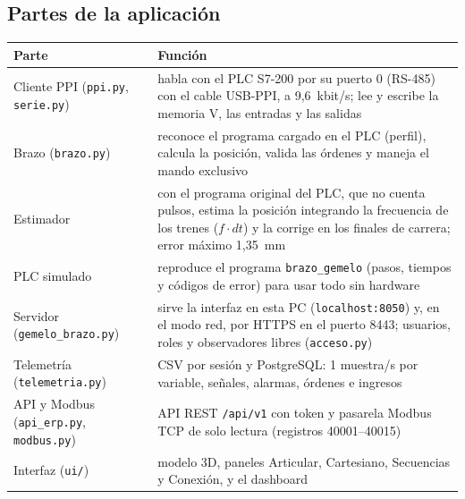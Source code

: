 \documentclass[11pt,a4paper]{article}
\newcommand{\codigo}[1]{\texttt{#1}}
\begin{document}
\subsection{Partes de la aplicación}
\begin{center}\small
\begin{tabularx}{\linewidth}{>{\raggedright}p{4.2cm} X}
\toprule
\textbf{Parte} & \textbf{Función}\\
\midrule
Cliente PPI (\codigo{ppi.py}, \codigo{serie.py}) & habla con el PLC S7-200 por su puerto 0 (RS-485) con el cable USB-PPI, a 9,6~kbit/s; lee y escribe la memoria V, las entradas y las salidas\\
Brazo (\codigo{brazo.py}) & reconoce el programa cargado en el PLC (perfil), calcula la posición, valida las órdenes y maneja el mando exclusivo\\
Estimador & con el programa original del PLC, que no cuenta pulsos, estima la posición integrando la frecuencia de los trenes ($f\cdot dt$) y la corrige en los finales de carrera; error máximo 1,35~mm\\
PLC simulado & reproduce el programa \codigo{brazo\_gemelo} (pasos, tiempos y códigos de error) para usar todo sin hardware\\
Servidor (\codigo{gemelo\_brazo.py}) & sirve la interfaz en esta PC (\codigo{localhost:8050}) y, en el modo red, por HTTPS en el puerto 8443; usuarios, roles y observadores libres (\codigo{acceso.py})\\
Telemetría (\codigo{telemetria.py}) & CSV por sesión y PostgreSQL: 1 muestra/s por variable, señales, alarmas, órdenes e ingresos\\
API y Modbus (\codigo{api\_erp.py}, \codigo{modbus.py}) & API REST \codigo{/api/v1} con token y pasarela Modbus TCP de solo lectura (registros 40001--40015)\\
Interfaz (\codigo{ui/}) & modelo 3D, paneles Articular, Cartesiano, Secuencias y Conexión, y el dashboard\\
\bottomrule
\end{tabularx}
\end{center}
\end{document}
